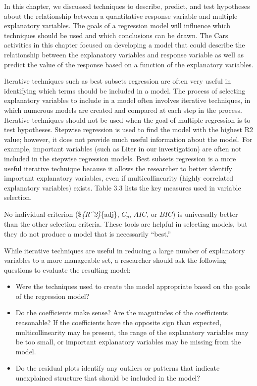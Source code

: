 \documentclass[
]{report}
\providecommand{\tightlist}{%
  \setlength{\itemsep}{0pt}\setlength{\parskip}{0pt}}
\begin{document}
In this chapter, we discussed techniques to describe, predict, and test hypotheses about the relationship
between a quantitative response variable and multiple explanatory variables. The goals of a regression model
will influence which techniques should be used and which conclusions can be drawn. The Cars activities
in this chapter focused on developing a model that could describe the relationship between the explanatory
variables and response variable as well as predict the value of the response based on a function of the explanatory variables.

Iterative techniques such as best subsets regression are often very useful in identifying which terms should be included in a model. The process of selecting explanatory variables to include in a model often involves iterative techniques, in which numerous models are created and compared at each step in the process. Iterative techniques should not be used when the goal of multiple regression is to test hypotheses. Stepwise regression is used to find the model with the highest R2 value; however, it does not provide much useful information about the model. For example, important variables (such as Liter in our investigation) are often not included in the stepwise regression models. Best subsets regression is a more useful iterative technique
because it allows the researcher to better identify important explanatory variables, even if multicollinearity (highly correlated explanatory variables) exists. Table 3.3 lists the key measures used in variable selection.

No individual criterion (\$\emph{\{R\^{}2\}}\{adj\}, \(C_p\), \(AIC\), or \(BIC\)) is universally better than the other selection criteria. These tools are helpful in selecting models, but they do not produce a model that is necessarily ``best.''

While iterative techniques are useful in reducing a large number of explanatory variables to a more manageable set, a researcher should ask the following questions to evaluate the resulting model:

\begin{itemize}
\tightlist
\item
  Were the techniques used to create the model appropriate based on the goals of the regression model?
\item
  Do the coefficients make sense? Are the magnitudes of the coefficients reasonable? If the coefficients have the opposite sign than expected, multicollinearity may be present, the range of the explanatory variables may be too small, or important explanatory variables may be missing from the model.
\item
  Do the residual plots identify any outliers or patterns that indicate unexplained structure that should be included in the model?
\end{itemize}
\end{document}
